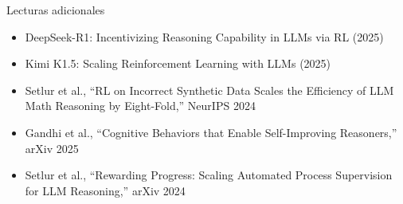 \begin{knowledgebox}{Lecturas adicionales}
\begin{itemize}
    \item DeepSeek-R1: Incentivizing Reasoning Capability in LLMs via RL (2025)
    \item Kimi K1.5: Scaling Reinforcement Learning with LLMs (2025)
    \item Setlur et al., ``RL on Incorrect Synthetic Data Scales the Efficiency of LLM Math Reasoning by Eight-Fold,'' NeurIPS 2024
    \item Gandhi et al., ``Cognitive Behaviors that Enable Self-Improving Reasoners,'' arXiv 2025
    \item Setlur et al., ``Rewarding Progress: Scaling Automated Process Supervision for LLM Reasoning,'' arXiv 2024
\end{itemize}
\end{knowledgebox}


